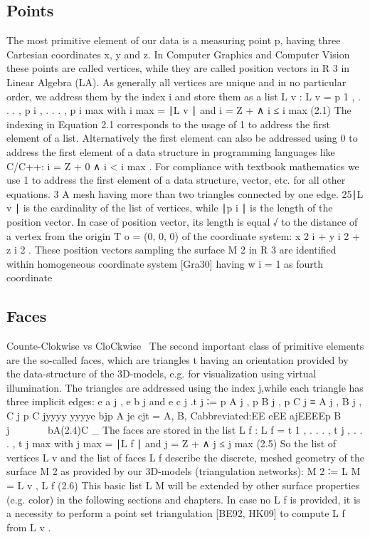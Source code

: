 \documentclass[openany]{book}
\begin{document}
\subsection{Points}
The most primitive element of our data is a measuring point p, having three 
Cartesian coordinates x, y and z. In Computer Graphics and Computer Vision these 
points are called vertices, while they are called position vectors in R 3 in 
Linear Algebra (LA). As generally all vertices are unique and in no particular 
order, we address them by the index i and store them as a list L v :
L v = { p 1 , . . . , p i , . . . , p i max } with i max = ∣L v ∣ and i = Z + ∧ 
i ≤ i max (2.1)
The indexing in Equation 2.1 corresponds to the usage of 1 to address the first 
element of a list. Alternatively the first element can also be addressed using 0 
to address the first element of a data structure in programming languages like 
C/C++: i = Z + 0 ∧ i < i max . For compliance with textbook mathematics we use 1 
to address the first element of a data structure, vector, etc. for all other 
equations. 3 A mesh having more than two triangles connected by one edge. 25∣L v 
∣ is the cardinality of the list of vertices, while ∣p i ∣ is the length of the 
position vector.
In case of position vector, its length is equal
√ to the distance of a vertex from the origin
T
o = (0, 0, 0) of the coordinate system: x 2 i + y i 2 + z i 2 . These position 
vectors sampling the surface M 2 in R 3 are identified within homogeneous 
coordinate system [Gra30] having
w i = 1 as fourth coordinate~\cite[p.~25-26]{Mara12}

\subsection{Faces}
Counte-Clokwise vs CloCkwise~\cite[p.~00]{SourceNeeded}
The second important class of primitive elements are the so-called faces, which 
are triangles t having an orientation provided by the data-structure of the 
3D-models, e.g. for visualization using virtual illumination. The triangles are 
addressed using the index j,while each triangle has three implicit edges: e a j 
, e b j and e c j .t j ∶= {p A j , p B j , p C j } ≡ {A j , B j , C j }p C jyyyy
yyyye bjp A je cjt = {A, B, C}abbreviated:EE eEE ajEEEEp B j~~~~~~ ~bA(2.4)C \_ 
The faces are stored in the list L f : L f = { t 1 , . . . , t j , . . . , t j 
max } with j max = ∣L f ∣ and j = Z + ∧ j ≤ j max
(2.5)
So the list of vertices L v and the list of faces L f describe the discrete, 
meshed geometry of the surface M 2 as provided by our 3D-models (triangulation 
networks): M 2 ∶= L M = {L v , L f } (2.6)
This basic list L M will be extended by other surface properties (e.g. color) in 
the following sections and chapters. In case no L f is provided, it is a 
necessity to perform a point set triangulation [BE92, HK09] to compute L f from 
L v .~\cite[p.~26]{Mara12}
\end{document}
